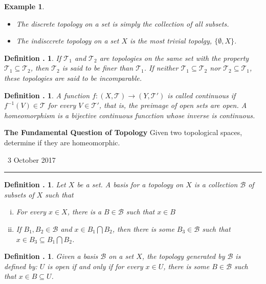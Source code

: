 \documentclass[twoside]{report}
\newcommand{\cleanbr}{\vspace{1em}\noindent}
\newcounter{Lecture}
\newcommand{\newLec}[1]{
  \stepcounter{Lecture}
  \noindent{\Large\bf Lecture \arabic{Lecture}} \, #1 \hfill  \rule[1ex]{2.5in}{.1pt} \vspace{1em}
}
\theoremstyle{myts}
\newcounter{c}[Lecture]
\newtheorem{dfn}[c]{Definition \arabic{Lecture}.}
\newtheorem*{epl}{Example}
\newcounter{ex}[Lecture]
\begin{document}
\begin{epl}
  \cleanbr
  \begin{itemize}
    \item The \emph{discrete topology} on a set is simply the collection of all subsets.
    \item The \emph{indisccrete topology} on a set $X$ is the most trivial topolgy, \(\{\emptyset, X\}\).
  \end{itemize}
\end{epl}

\begin{dfn}
  If \(\mathcal{T}_1\) and \(\mathcal{T}_2\) are topologies on the same set with the property \( \mathcal{T}_1 \subseteq \mathcal{T}_2 \), then \(\mathcal{T}_2\) is said to be \emph{finer} than \(\mathcal{T}_1\). If neither \( \mathcal{T}_1 \subseteq \mathcal{T}_2 \) nor \( \mathcal{T}_2 \subseteq \mathcal{T}_1 \), these topologies are said to be \emph{incomparable}.
\end{dfn}

\begin{dfn}
  A function \( f : (X,\mathcal{T}) \to (Y,\mathcal{T}') \) is called \emph{continuous} if \(f^{-1}(V) \in \mathcal{T}\) for every \(V\in\mathcal{T}'\), that is, the preimage of open sets are open. A \emph{homeomorphism} is a bijective continuous funcction whose inverse is continuous.
\end{dfn}

\noindent
{\bf The Fundamental Question of Topology}  Given two topological spaces, determine if they are homeomorphic.
\cleanbr

\newLec{3 October 2017}

\begin{dfn}
  Let $X$ be a set. A \emph{basis} for a topology on $X$ is a collection $\mathcal{B}$ of subsets of $X$ such that
  \begin{enumerate}[(i)]
    \item For every \(x\in X\), there is a \(B\in\mathcal{B}\) such that \(x\in B\)
    \item If \( B_1,B_2 \in\mathcal{B} \) and \( x\in B_1\bigcap B_2 \), then there is some \(B_3\in\mathcal{B}\) such that \(x\in B_3\subseteq B_1\bigcap B_2 \).
  \end{enumerate}
\end{dfn}

\begin{dfn}
  Given a basis $\mathcal{B}$ on a set $X$, the \emph{topology generated by $\mathcal{B}$} is defined by: $U$ is open if and only if for every \(x\in U\), there is some \(B\in\mathcal{B}\) such that \(x\in B\subseteq U\).
\end{dfn}
\end{document}
